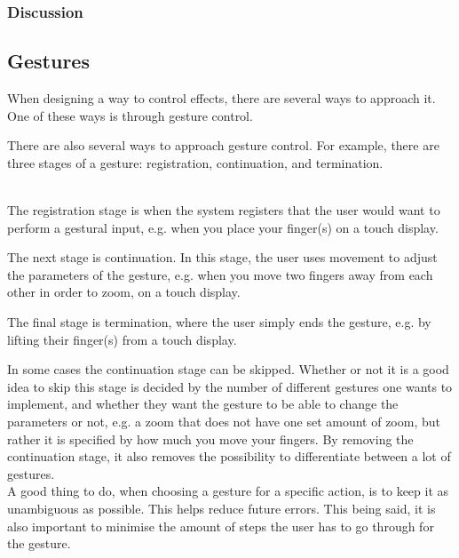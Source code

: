 \subsubsection{Discussion}



\subsection{Gestures}

When designing a way to control effects, there are several ways to approach it. One of these ways is through gesture control.

There are also several ways to approach gesture control. For example, there are three stages of a gesture: registration, continuation, and termination\citep[pp. 127-134]{Wigdor_2011}.\\

\begin{minipage}{\linewidth}%
\label{Gestures}
\end{minipage}\\

The registration stage is when the system registers that the user would want to perform a gestural input, e.g. when you place your finger(s) on a touch display. 

The next stage is continuation. In this stage, the user uses movement to adjust the parameters of the gesture, e.g. when you move two fingers away from each other in order to zoom, on a touch display.

The final stage is termination, where the user simply ends the gesture, e.g. by lifting their finger(s) from a touch display.

In some cases the continuation stage can be skipped. Whether or not it is a good idea to skip this stage is decided by the number of different gestures one wants to implement, and whether they want the gesture to be able to change the parameters or not, e.g. a zoom that does not have one set amount of zoom, but rather it is specified by how much you move your fingers. By removing the continuation stage, it also removes the possibility to differentiate between a lot of gestures. \\

A good thing to do, when choosing a gesture for a specific action, is to keep it as unambiguous as possible. This helps reduce future errors. This being said, it is also important to minimise the amount of steps the user has to go through for the gesture.

